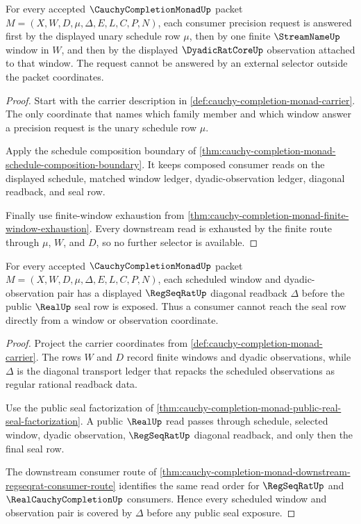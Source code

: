\begin{theorem}
\label{thm:cauchy-completion-monad-schedule-totality}
For every accepted $\CauchyCompletionMonadUp$ packet $M=(X,W,D,\mu,\Delta,E,L,C,P,N)$, each consumer precision request is answered first by the displayed unary schedule row $\mu$, then by one finite $\StreamNameUp$ window in $W$, and then by the displayed $\DyadicRatCoreUp$ observation attached to that window. The request cannot be answered by an external selector outside the packet coordinates.
\end{theorem}
\begin{proof}
Start with the carrier description in \autoref{def:cauchy-completion-monad-carrier}. The only coordinate that names which family member and which window answer a precision request is the unary schedule row $\mu$.

Apply the schedule composition boundary of \autoref{thm:cauchy-completion-monad-schedule-composition-boundary}. It keeps composed consumer reads on the displayed schedule, matched window ledger, dyadic-observation ledger, diagonal readback, and seal row.

Finally use finite-window exhaustion from \autoref{thm:cauchy-completion-monad-finite-window-exhaustion}. Every downstream read is exhausted by the finite route through $\mu$, $W$, and $D$, so no further selector is available.
\end{proof}

\begin{theorem}
\label{thm:cauchy-completion-monad-diagonal-readback-coverage}
For every accepted $\CauchyCompletionMonadUp$ packet $M=(X,W,D,\mu,\Delta,E,L,C,P,N)$, each scheduled window and dyadic-observation pair has a displayed $\RegSeqRatUp$ diagonal readback $\Delta$ before the public $\RealUp$ seal row is exposed. Thus a consumer cannot reach the seal row directly from a window or observation coordinate.
\end{theorem}
\begin{proof}
Project the carrier coordinates from \autoref{def:cauchy-completion-monad-carrier}. The rows $W$ and $D$ record finite windows and dyadic observations, while $\Delta$ is the diagonal transport ledger that repacks the scheduled observations as regular rational readback data.

Use the public seal factorization of \autoref{thm:cauchy-completion-monad-public-real-seal-factorization}. A public $\RealUp$ read passes through schedule, selected window, dyadic observation, $\RegSeqRatUp$ diagonal readback, and only then the final seal row.

The downstream consumer route of \autoref{thm:cauchy-completion-monad-downstream-regseqrat-consumer-route} identifies the same read order for $\RegSeqRatUp$ and $\RealCauchyCompletionUp$ consumers. Hence every scheduled window and observation pair is covered by $\Delta$ before any public seal exposure.
\end{proof}

